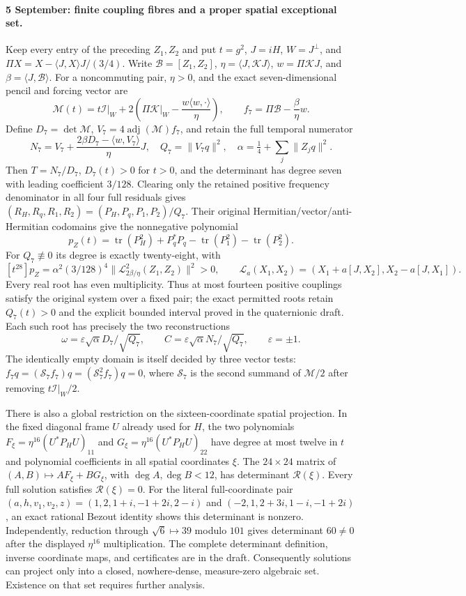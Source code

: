 \documentclass[10pt,letterpaper]{article}
\begin{document}
\paragraph{5 September: finite coupling fibres and a proper spatial exceptional set.}
Keep every entry of the preceding $Z_1,Z_2$ and put
$t=g^2$, $J=iH$, $W=J^\perp$, and
$\Pi X=X-\langle J,X\rangle J/(3/4)$. Write
$\mathscr B=[Z_1,Z_2]$, $\eta=\langle J,\mathcal KJ\rangle$,
$w=\Pi\mathcal KJ$, and $\beta=\langle J,\mathscr B\rangle$.
For a noncommuting pair, $\eta>0$, and the exact seven-dimensional
pencil and forcing vector are
\[
 \mathscr M(t)=t\mathcal I|_W+
  2\left(\Pi\mathcal K|_W-\frac{w\langle w,\cdot\rangle}{\eta}\right),
 \qquad f_7=\Pi\mathscr B-\frac\beta\eta w.
\]
Define $D_7=\det\mathscr M$, $V_7=4\operatorname{adj}(\mathscr M)f_7$,
and retain the full temporal numerator
\[
 N_7=V_7+\frac{2\beta D_7-\langle w,V_7\rangle}{\eta}J,
 \quad Q_7=\|V_7q\|^2,
 \quad\alpha=\tfrac14+\sum_j\|Z_jq\|^2.
\]
Then $T=N_7/D_7$, $D_7(t)>0$ for $t>0$, and the determinant has
degree seven with leading coefficient $3/128$.
Clearing only the retained positive frequency denominator in all four
full residuals gives $(R_H,R_q,R_1,R_2)=(P_H,P_q,P_1,P_2)/Q_7$.
Their original Hermitian/vector/anti-Hermitian codomains give the
nonnegative polynomial
\[
 p_Z(t)=\operatorname{tr}(P_H^2)+P_q^*P_q-
                 \operatorname{tr}(P_1^2)-\operatorname{tr}(P_2^2).
\]
For $Q_7\not\equiv0$ its degree is exactly twenty-eight, with
\[
 [t^{28}]p_Z=\alpha^2(3/128)^4
       \|\mathcal L_{2\beta/\eta}^2(Z_1,Z_2)\|^2>0,\qquad
 \mathcal L_a(X_1,X_2)=(X_1+a[J,X_2],X_2-a[J,X_1]).
\]
Every real root has even multiplicity. Thus at most fourteen
positive couplings satisfy the original system over a fixed pair;
the exact permitted roots retain $Q_7(t)>0$ and the explicit bounded
interval proved in the quaternionic draft. Each such root has precisely
the two reconstructions
\[
 \omega=\varepsilon\sqrt\alpha D_7/\sqrt{Q_7},\qquad
 C=\varepsilon\sqrt\alpha N_7/\sqrt{Q_7},\qquad\varepsilon=\pm1.
\]
The identically empty domain is itself decided by three vector tests:
$f_7q=(\mathcal S_7f_7)q=(\mathcal S_7^2f_7)q=0$, where
$\mathcal S_7$ is the second summand of $\mathscr M/2$ after
removing $t\mathcal I|_W/2$.

There is also a global restriction on the sixteen-coordinate spatial
projection. In the fixed diagonal frame $U$ already used for $H$, the
two polynomials
$F_\xi=\eta^{16}(U^*P_HU)_{11}$ and
$G_\xi=\eta^{16}(U^*P_HU)_{22}$ have degree at most twelve in $t$
and polynomial coefficients in all spatial coordinates $\xi$.
The $24\times24$ matrix of $(A,B)\mapsto AF_\xi+BG_\xi$, with
$\deg A,\deg B<12$, has determinant $\mathscr R(\xi)$.
Every full solution satisfies $\mathscr R(\xi)=0$.
For the literal full-coordinate pair
$(a,h,v_1,v_2,z)=(1,2,1+i,-1+2i,2-i)$ and
$(-2,1,2+3i,1-i,-1+2i)$, an exact rational Bezout identity shows
this determinant is nonzero. Independently, reduction through
$\sqrt6\mapsto39$ modulo $101$ gives determinant $60\ne0$ after
the displayed $\eta^{16}$ multiplication. The complete determinant
definition, inverse coordinate maps, and certificates are in the draft.
Consequently solutions can project only into a closed, nowhere-dense,
measure-zero algebraic set. Existence on that set requires further analysis.
\end{document}
